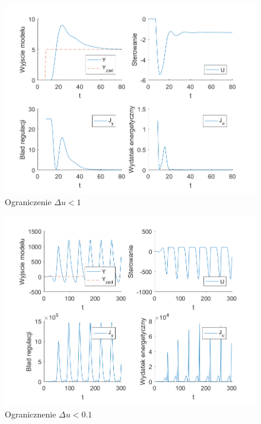 \documentclass[a4paper, 10pt]{article}
\begin{document}
	\begin{figure}[H]
					\centering
					\includegraphics[width=0.9\linewidth]{z7_1_-1000_100}
					\caption{Ograniczenie $\Delta u < 1$}
					\label{fig:z7_1_-1000_100}
					\end{figure}
	\begin{figure}[H]
				\centering
				\includegraphics[width=0.9\linewidth]{z7_01_-1000_100}
				\caption{Ogranicznenie  $\Delta u < 0.1$}
				\label{fig:z7_01_-1000_100}
				\end{figure}	
\end{document}
